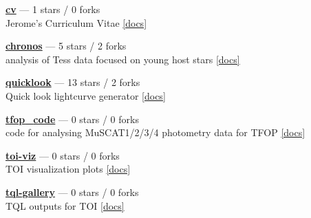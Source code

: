 \item \href{https://github.com/jpdeleon/cv}{{\bf cv}} --- 1 stars / 0 forks \\
Jerome's Curriculum Vitae \href{https://raw.githubusercontent.com/jpdeleon/cv/main-pdf/tex/cv_pubs.pdf}{[docs]}

\item \href{https://github.com/jpdeleon/chronos}{{\bf chronos}} --- 5 stars / 2 forks \\
analysis of Tess data focused on young host stars \href{None}{[docs]}

\item \href{https://github.com/jpdeleon/quicklook}{{\bf quicklook}} --- 13 stars / 2 forks \\
Quick look lightcurve generator \href{None}{[docs]}

\item \href{https://github.com/jpdeleon/tfop_code}{{\bf tfop{\_}code}} --- 0 stars / 0 forks \\
code for analysing MuSCAT1/2/3/4 photometry data for TFOP \href{None}{[docs]}

\item \href{https://github.com/jpdeleon/toi-viz}{{\bf toi-viz}} --- 0 stars / 0 forks \\
TOI visualization plots \href{None}{[docs]}

\item \href{https://github.com/jpdeleon/tql-gallery}{{\bf tql-gallery}} --- 0 stars / 0 forks \\
TQL outputs for TOI \href{None}{[docs]}